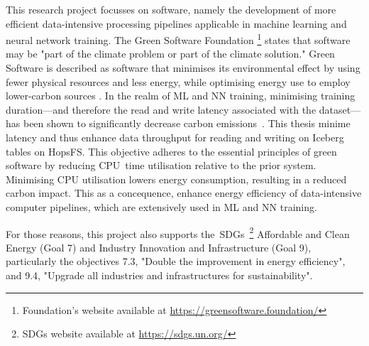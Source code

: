 This research project focusses on software, namely the development of more efficient data-intensive processing pipelines applicable in machine learning and neural network training. The Green Software Foundation \footnote{Foundation's website available at \url{https://greensoftware.foundation/}} states that software may be "part of the climate problem or part of the climate solution." Green Software is described as software that minimises its environmental effect by using fewer physical resources and less energy, while optimising energy use to employ lower-carbon sources \cite{WhatGreenSoftware2021}. In the realm of \gls{ML} and \gls{NN} training, minimising training duration—and therefore the read and write latency associated with the dataset—has been shown to significantly decrease carbon emissions~\cite{pattersonCarbonEmissionsLarge2021,pattersonCarbonFootprintMachine2022}. This thesis minime latency and thus enhance data throughput for reading and writing on Iceberg tables on \gls{HopsFS}. This objective adheres to the essential principles of green software by reducing \gls{CPU} time utilisation relative to the prior system. Minimising \gls{CPU} utilisation lowers energy consumption, resulting in a reduced carbon impact. This as a concequence, enhance energy efficiency of data-intensive computer pipelines, which are extensively used in \gls{ML} and \gls{NN} training.

For those reasons, this project also supports the \glspl{SDG}~\footnote{\glspl{SDG} website available at \url{https://sdgs.un.org/}} Affordable and Clean Energy (Goal 7) and Industry Innovation and Infrastructure (Goal 9), particularly the objectives 7.3, "Double the improvement in energy efficiency", and 9.4, "Upgrade all industries and infrastructures for sustainability".

